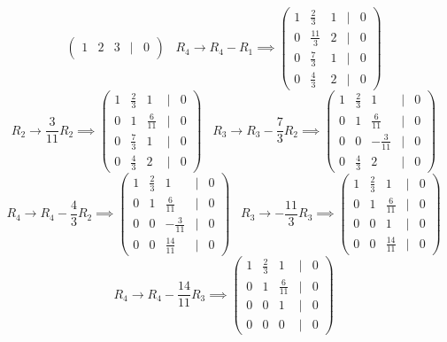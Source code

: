 \documentclass[a4paper]{article}
\begin{document}
\begin{enumerate}
$$\begin{pmatrix}
    1 & 2 & 3 & | & 0
    \end{pmatrix} \; \; \;
    R_4 \rightarrow R_4 - R_1 \implies \begin{pmatrix}
    1 & \frac{2}{3} & 1 & | & 0 \\
    0 & \frac{11}{3} & 2 & | & 0 \\
    0 & \frac{7}{3} & 1 & | & 0 \\
    0 & \frac{4}{3} & 2 & | & 0
    \end{pmatrix}
    $$
    $$
    R_2 \rightarrow \frac{3}{11} R_2 \implies \begin{pmatrix}
    1 & \frac{2}{3} & 1 & | & 0 \\
    0 & 1 & \frac{6}{11} & | & 0 \\
    0 & \frac{7}{3} & 1 & | & 0 \\
    0 & \frac{4}{3} & 2 & | & 0
    \end{pmatrix}
    \; \; \;
    R_3 \rightarrow R_3 - \frac{7}{3}R_2 \implies \begin{pmatrix}
    1 & \frac{2}{3} & 1 & | & 0 \\
    0 & 1 & \frac{6}{11} & | & 0 \\
    0 & 0 & -\frac{3}{11} & | & 0 \\
    0 & \frac{4}{3} & 2 & | & 0
    \end{pmatrix}
    $$
    $$
    R_4 \rightarrow R_4 - \frac{4}{3}R_2 \implies \begin{pmatrix}
    1 & \frac{2}{3} & 1 & | & 0 \\
    0 & 1 & \frac{6}{11} & | & 0 \\
    0 & 0 & -\frac{3}{11} & | & 0 \\
    0 & 0 & \frac{14}{11} & | & 0
    \end{pmatrix}\; \; \;
    R_3 \rightarrow -\frac{11}{3} R_3 \implies \begin{pmatrix}
    1 & \frac{2}{3} & 1 & | & 0 \\
    0 & 1 & \frac{6}{11} & | & 0 \\
    0 & 0 & 1 & | & 0 \\
    0 & 0 & \frac{14}{11} & | & 0
    \end{pmatrix}
    $$
    $$
    R_4 \rightarrow R_4 - \frac{14}{11}R_3 \implies \begin{pmatrix}
    1 & \frac{2}{3} & 1 & | & 0 \\
    0 & 1 & \frac{6}{11} & | & 0 \\
    0 & 0 & 1 & | & 0 \\
    0 & 0 & 0 & | & 0
    \end{pmatrix}
    $$
        

\end{enumerate}
\end{document}

